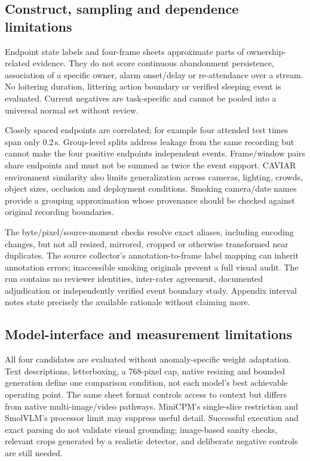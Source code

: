 \documentclass[11pt,a4paper]{article}
\begin{document}
\subsection{Construct, sampling and dependence limitations}
Endpoint state labels and four-frame sheets approximate parts of ownership-related evidence. They do not score continuous abandonment persistence, association of a specific owner, alarm onset/delay or re-attendance over a stream. No loitering duration, littering action boundary or verified sleeping event is evaluated. Current negatives are task-specific and cannot be pooled into a universal normal set without review.

Closely spaced endpoints are correlated; for example four attended test times span only 0.2\,s. Group-level splits address leakage from the same recording but cannot make the four positive endpoints independent events. Frame/window pairs share endpoints and must not be summed as twice the event support. CAVIAR environment similarity also limits generalization across cameras, lighting, crowds, object sizes, occlusion and deployment conditions. Smoking camera/date names provide a grouping approximation whose provenance should be checked against original recording boundaries.

The byte/pixel/source-moment checks resolve exact aliases, including encoding changes, but not all resized, mirrored, cropped or otherwise transformed near duplicates. The source collector's annotation-to-frame label mapping can inherit annotation errors; inaccessible smoking originals prevent a full visual audit. The run contains no reviewer identities, inter-rater agreement, documented adjudication or independently verified event boundary study. Appendix interval notes state precisely the available rationale without claiming more.

\subsection{Model-interface and measurement limitations}
All four candidates are evaluated without anomaly-specific weight adaptation. Text descriptions, letterboxing, a 768-pixel cap, native resizing and bounded generation define one comparison condition, not each model's best achievable operating point. The same sheet format controls access to context but differs from native multi-image/video pathways. MiniCPM's single-slice restriction and SmolVLM's processor limit may suppress useful detail. Successful execution and exact parsing do not validate visual grounding; image-based sanity checks, relevant crops generated by a realistic detector, and deliberate negative controls are still needed.
\end{document}
